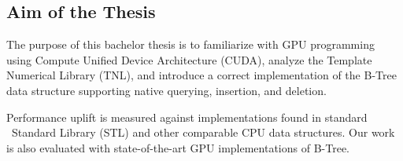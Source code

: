 \subsection{Aim of the Thesis}

The purpose of this bachelor thesis is to familiarize with GPU programming using Compute Unified Device Architecture (CUDA), analyze the Template Numerical Library (TNL), and introduce a correct implementation of the B-Tree data structure supporting native querying, insertion, and deletion.

Performance uplift is measured against implementations found in standard \CC\ Standard Library (STL) and other comparable CPU data structures. Our work is also evaluated with state-of-the-art GPU implementations of B-Tree.